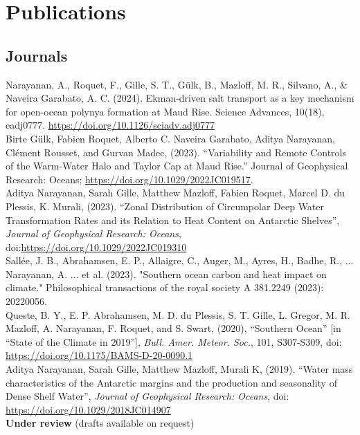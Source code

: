 \documentclass[12pt, a4paper]{article}
\newcommand{\years}[1]{\marginnote{\small #1}}
\begin{document}
\newpage
\section*{Publications}

\subsection*{\bf Journals}

\years{2024} Narayanan, A., Roquet, F., Gille, S. T., Gülk, B., Mazloff, M. R., Silvano, A., \& Naveira Garabato, A. C. (2024). Ekman-driven salt transport as a key mechanism for open-ocean polynya formation at Maud Rise. Science Advances, 10(18), eadj0777. \url{https://doi.org/10.1126/sciadv.adj0777}\\
\years{2023} Birte Gülk, Fabien Roquet, Alberto C. Naveira Garabato, Aditya Narayanan, Clément Rousset, and Gurvan Madec, (2023). “Variability and Remote Controls of the Warm-Water Halo and Taylor Cap at Maud Rise.” Journal of Geophysical Research: Oceans; \url{https://doi.org/10.1029/2022JC019517}.\\
\years{2023} Aditya Narayanan, Sarah Gille, Matthew Mazloff, Fabien Roquet, Marcel D. du Plessis, K. Murali, (2023). ``Zonal Distribution of Circumpolar Deep Water Transformation Rates and its Relation to Heat Content on Antarctic Shelves'', \emph{Journal of Geophysical Research: Oceans}, doi:\url{https://doi.org/10.1029/2022JC019310}\\
\years{2023} Sallée, J. B., Abrahamsen, E. P., Allaigre, C., Auger, M., Ayres, H., Badhe, R., ... Narayanan, A. ... et al. (2023). "Southern ocean carbon and heat impact on climate." Philosophical transactions of the royal society A 381.2249 (2023): 20220056.\\
\years{2020} Queste, B. Y., E. P. Abrahamsen, M. D. du Plessis, S. T. Gille, L. Gregor, M. R. Mazloff, A. Narayanan, F. Roquet, and S. Swart, (2020), ``Southern Ocean'' [in ``State of the Climate in 2019''], \emph{Bull. Amer. Meteor. Soc.}, 101, S307-S309, doi: \url{https://doi.org/10.1175/BAMS-D-20-0090.1}\\
\years{2019} Aditya Narayanan, Sarah Gille, Matthew Mazloff, Murali K, (2019). ``Water mass characteristics of the Antarctic margins and the production and seasonality of Dense Shelf Water'', \emph{Journal of Geophysical Research: Oceans}, doi: \url{https://doi.org/10.1029/2018JC014907}\\


{\bf Under review} (drafts available on request)\\
\end{document}
